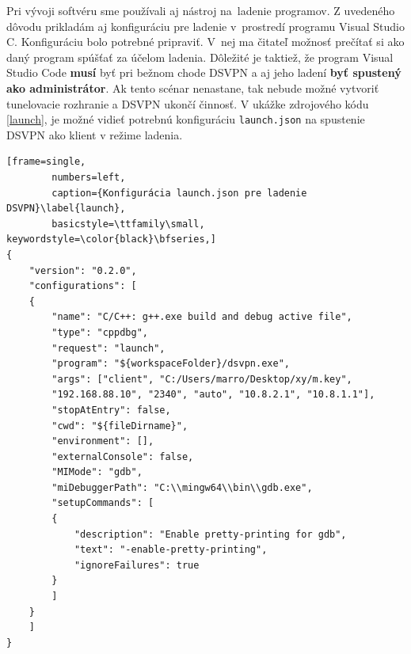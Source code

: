 Pri vývoji softvéru sme používali aj nástroj na~ladenie programov. Z uvedeného dôvodu prikladám aj konfiguráciu pre ladenie v~prostredí programu Visual Studio C. Konfiguráciu bolo potrebné pripraviť. V~nej ma čitateľ možnosť prečítať si ako daný program spúšťať za účelom ladenia. Dôležité je taktiež, že program Visual Studio Code \textbf{musí} byť pri bežnom chode DSVPN a aj jeho ladení \textbf{byť spustený ako administrátor}. Ak tento scénar nenastane, tak nebude možné vytvoriť tunelovacie rozhranie a DSVPN ukončí činnosť. V ukážke zdrojového kódu \ref{launch}, je možné vidieť potrebnú konfiguráciu \lstinline|launch.json| na spustenie DSVPN ako klient v režime ladenia. 

\begin{minipage}{\linewidth} 	
	\begin{lstlisting}[frame=single,
		numbers=left,
		caption={Konfigurácia launch.json pre ladenie DSVPN}\label{launch},
		basicstyle=\ttfamily\small, keywordstyle=\color{black}\bfseries,]
{
	"version": "0.2.0",
	"configurations": [
	{
		"name": "C/C++: g++.exe build and debug active file",
		"type": "cppdbg",
		"request": "launch",
		"program": "${workspaceFolder}/dsvpn.exe",
		"args": ["client", "C:/Users/marro/Desktop/xy/m.key", 
		"192.168.88.10", "2340", "auto", "10.8.2.1", "10.8.1.1"],
		"stopAtEntry": false,
		"cwd": "${fileDirname}",
		"environment": [],
		"externalConsole": false,
		"MIMode": "gdb",
		"miDebuggerPath": "C:\\mingw64\\bin\\gdb.exe",
		"setupCommands": [
		{
			"description": "Enable pretty-printing for gdb",
			"text": "-enable-pretty-printing",
			"ignoreFailures": true
		}
		]
	}
	]
}
	\end{lstlisting}
\end{minipage}\\